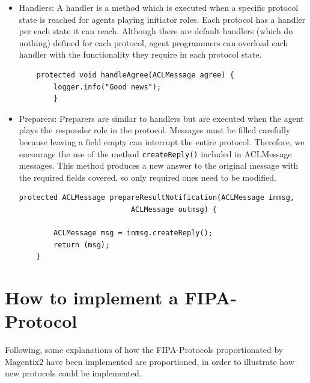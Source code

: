 \begin{itemize}



 \item	Handlers:
A handler is a method which is executed when a specific protocol state is reached for agents playing initiator roles. Each protocol has a handler per each state it can reach. Although there are default handlers (which do nothing) defined for each protocol, agent programmers can overload each handler with the functionality they require in each protocol state.
\begin{lstlisting}
	protected void handleAgree(ACLMessage agree) {
		logger.info("Good news");
		}
\end{lstlisting}
 \item	Preparers:
Preparers are similar to handlers but are executed when the agent plays the responder role in the protocol.
Messages must be filled carefully because leaving a field empty can interrupt the entire protocol.  Therefore, we encourage the use of the method \lstinline|createReply()| included in ACLMessage messages. This method produces a new answer to the original message with the required fields covered, so only required ones need to be modified.
\begin{lstlisting}
protected ACLMessage prepareResultNotification(ACLMessage inmsg,
					      ACLMessage outmsg) {

	    ACLMessage msg = inmsg.createReply();
	    return (msg);
	}
\end{lstlisting}
\end{itemize}
\section{How to implement a FIPA-Protocol}
Following, some explanations of how  the  FIPA-Protocols proportionated by Magentix2 have been implemented are proportioned, in order to illustrate how new protocols could be implemented.

